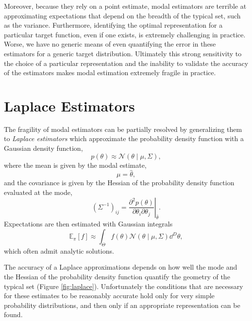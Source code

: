 Moreover, because they rely on a point estimate, modal estimators are 
terrible at approximating expectations that depend on the breadth of 
the typical set, such as the variance.  Furthermore, identifying the optimal 
representation for a particular target function, even if one exists, is 
extremely challenging in practice.  Worse, we have no generic means
of even quantifying the error in these estimators for a generic target
distribution.  Ultimately this strong sensitivity to the choice of a particular
representation and the inability to validate the accuracy of the estimators 
makes modal estimation extremely fragile in practice.

\section{Laplace Estimators}

The fragility of modal estimators can be partially resolved by generalizing
them to \emph{Laplace estimators} which approximate the probability
density function with a Gaussian density function,
%
\begin{equation*}
p \! \left( \theta \right) \approx 
\mathcal{N} \! \left( \theta \mid \mu, \Sigma \right),
\end{equation*}
%
where the mean is given by the modal estimate,
%
\begin{equation*}
\mu = \hat{\theta},
\end{equation*}
%
and the covariance is given by the Hessian of the probability density 
function evaluated at the mode,
%
\begin{equation*}
\left( \Sigma^{-1} \right)_{ij} = \left.
\frac{ \partial^{2} p \! \left( \theta \right) }
{ \partial \theta_{i} \partial \theta_{j} }
\right|_{\hat{\theta}}.
\end{equation*}
%
Expectations are then estimated with Gaussian integrals
%
\begin{equation*}
\mathbb{E}_{\pi} \! \left[ f \right]
\approx 
\int_{\Theta} f \! \left( \theta \right) 
\mathcal{N} \! \left( \theta \mid \mu, \Sigma \right) \dd^{D} \theta,
\end{equation*}
%
which often admit analytic solutions.

The accuracy of a Laplace approximations depends on how well the
mode and the Hessian of the probability density function quantify the 
geometry of the typical set (Figure \ref{fig:laplace}).  Unfortunately the 
conditions that are necessary for these estimates to be reasonably 
accurate hold only for very simple probability distributions, and then 
only if an appropriate representation can be found.  

